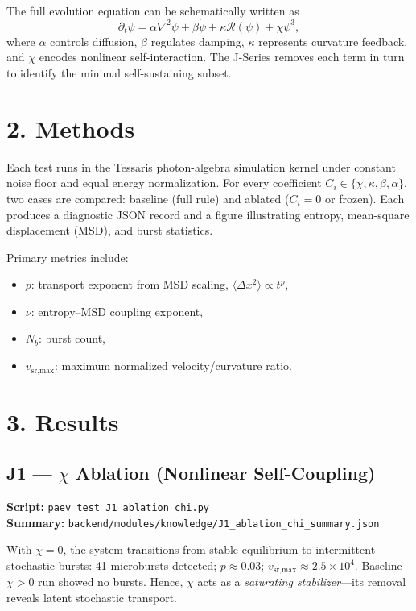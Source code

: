 \documentclass[12pt]{article}
\begin{document}
The full evolution equation can be schematically written as
\[
\partial_t \psi = 
\alpha \nabla^2 \psi 
+ \beta \dot{\psi}
+ \kappa \mathcal{R}(\psi)
+ \chi \psi^3,
\]
where \(\alpha\) controls diffusion, \(\beta\) regulates damping, \(\kappa\) represents curvature feedback, and \(\chi\) encodes nonlinear self-interaction.
The J-Series removes each term in turn to identify the minimal self-sustaining subset.

\section*{2. Methods}
Each test runs in the Tessaris photon-algebra simulation kernel under constant noise floor and equal energy normalization.
For every coefficient \(C_i\in\{\chi, \kappa, \beta, \alpha\}\),
two cases are compared:
baseline (full rule) and ablated (\(C_i=0\) or frozen).
Each produces a diagnostic JSON record and a figure illustrating
entropy, mean-square displacement (MSD), and burst statistics.

Primary metrics include:
\begin{itemize}
  \item \(p\): transport exponent from MSD scaling, \( \langle \Delta x^2 \rangle \propto t^p \),
  \item \(\nu\): entropy--MSD coupling exponent,
  \item \(N_b\): burst count,
  \item \(v_{\text{sr,max}}\): maximum normalized velocity/curvature ratio.
\end{itemize}

\section*{3. Results}

\subsection*{J1 — $\chi$ Ablation (Nonlinear Self-Coupling)}
\textbf{Script:} \texttt{paev\_test\_J1\_ablation\_chi.py}\\
\textbf{Summary:} \texttt{backend/modules/knowledge/J1\_ablation\_chi\_summary.json}

With \(\chi=0\), the system transitions from stable equilibrium to intermittent stochastic bursts:
41 microbursts detected; \(p\approx0.03\); \(v_{\text{sr,max}}\approx2.5\times10^4\).
Baseline \(\chi>0\) run showed no bursts.
Hence, $\chi$ acts as a \emph{saturating stabilizer}—its removal reveals latent stochastic transport.
\end{document}
